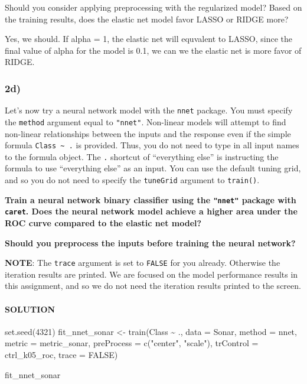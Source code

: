 \documentclass[
]{article}
\newenvironment{Shaded}{\begin{snugshade}}{\end{snugshade}}
\newcommand{\AttributeTok}[1]{\textcolor[rgb]{0.77,0.63,0.00}{#1}}
\newcommand{\ConstantTok}[1]{\textcolor[rgb]{0.00,0.00,0.00}{#1}}
\newcommand{\DecValTok}[1]{\textcolor[rgb]{0.00,0.00,0.81}{#1}}
\newcommand{\FunctionTok}[1]{\textcolor[rgb]{0.00,0.00,0.00}{#1}}
\newcommand{\NormalTok}[1]{#1}
\newcommand{\OtherTok}[1]{\textcolor[rgb]{0.56,0.35,0.01}{#1}}
\newcommand{\SpecialCharTok}[1]{\textcolor[rgb]{0.00,0.00,0.00}{#1}}
\newcommand{\StringTok}[1]{\textcolor[rgb]{0.31,0.60,0.02}{#1}}
\begin{document}
Should you consider applying preprocessing with the regularized model?
Based on the training results, does the elastic net model favor LASSO or
RIDGE more?

Yes, we should. If alpha = 1, the elastic net will equvalent to LASSO,
since the final value of alpha for the model is 0.1, we can we the
elastic net is more favor of RIDGE.

\hypertarget{d-1}{%
\subsubsection{2d)}\label{d-1}}

Let's now try a neural network model with the \texttt{nnet} package. You
must specify the \texttt{method} argument equal to \texttt{"nnet"}.
Non-linear models will attempt to find non-linear relationships between
the inputs and the response even if the simple formula
\texttt{Class\ \textasciitilde{}\ .} is provided. Thus, you do not need
to type in all input names to the formula object. The \texttt{.}
shortcut of ``everything else'' is instructing the formula to use
``everything else'' as an input. You can use the default tuning grid,
and so you do not need to specify the \texttt{tuneGrid} argument to
\texttt{train()}.

\textbf{Train a neural network binary classifier using the
\texttt{"nnet"} package with \texttt{caret}. Does the neural network
model achieve a higher area under the ROC curve compared to the elastic
net model?}

\textbf{Should you preprocess the inputs before training the neural
network?}

\textbf{NOTE}: The \texttt{trace} argument is set to \texttt{FALSE} for
you already. Otherwise the iteration results are printed. We are focused
on the model performance results in this assignment, and so we do not
need the iteration results printed to the screen.

\hypertarget{solution-8}{%
\paragraph{SOLUTION}\label{solution-8}}

\begin{Shaded}
\begin{Highlighting}[]
\FunctionTok{set.seed}\NormalTok{(}\DecValTok{4321}\NormalTok{)}
\NormalTok{fit\_nnet\_sonar }\OtherTok{\textless{}{-}} \FunctionTok{train}\NormalTok{(Class }\SpecialCharTok{\textasciitilde{}}\NormalTok{ .,}
                        \AttributeTok{data =}\NormalTok{ Sonar,}
                        \AttributeTok{method =} \StringTok{\textquotesingle{}nnet\textquotesingle{}}\NormalTok{,}
                        \AttributeTok{metric =}\NormalTok{ metric\_sonar,}
                        \AttributeTok{preProcess =} \FunctionTok{c}\NormalTok{(}\StringTok{"center"}\NormalTok{, }\StringTok{"scale"}\NormalTok{),}
                        \AttributeTok{trControl =}\NormalTok{ ctrl\_k05\_roc,}
                        \AttributeTok{trace =} \ConstantTok{FALSE}\NormalTok{)}

\NormalTok{fit\_nnet\_sonar}
\end{Highlighting}
\end{Shaded}
\end{document}
